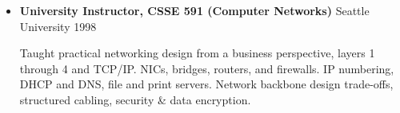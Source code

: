 \begin{itemize}
    \vspace{-2.5mm}
	\item \textbf{University Instructor, CSSE 591 (Computer Networks)} \hfill Seattle University \hfill 1998
        \vspace{-2mm}
        \begin{myquote}
            Taught practical networking design from a business perspective, layers
            1 through 4 and TCP/IP. NICs, bridges, routers, and firewalls.
            IP numbering, DHCP and DNS, file and print servers. Network
            backbone design trade-offs, structured cabling, security \& data
            encryption.
        \end{myquote}
\end{itemize}

